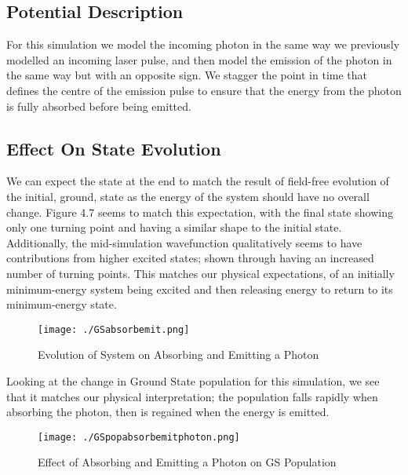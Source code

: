 \subsection{Potential Description}
For this simulation we model the incoming photon in the same way we previously modelled an incoming laser pulse, and then model the emission of the photon in the same way but with an opposite sign. We stagger the point in time that defines the centre of the emission pulse to ensure that the energy from the photon is fully absorbed before being emitted. 

\subsection{Effect On State Evolution}
We can expect the state at the end to match the result of field-free evolution of the initial, ground, state as the energy of the system should have no overall change. Figure 4.7 seems to match this expectation, with the final state showing only one turning point and having a similar shape to the initial state. Additionally, the mid-simulation wavefunction qualitatively seems to have contributions from higher excited states; shown through having an increased number of turning points. This matches our physical expectations, of an initially minimum-energy system being excited and then releasing energy to return to its minimum-energy state.

\begin{figure}[H]
          \texttt{[image: ./GSabsorbemit.png]}
          \centering
          \caption{Evolution of System on Absorbing and Emitting a Photon}
\end{figure}

Looking at the change in Ground State population for this simulation, we see that it matches our physical interpretation; the population falls rapidly when absorbing the photon, then is regained when the energy is emitted. 

\begin{figure}[H]
          \texttt{[image: ./GSpopabsorbemitphoton.png]}
          \centering
          \caption{Effect of Absorbing and Emitting a Photon on GS Population}
\end{figure}


